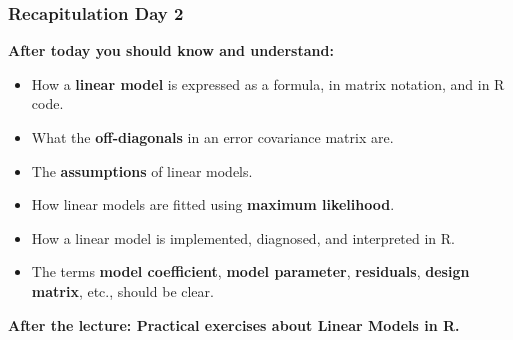 \documentclass{beamer}
\newenvironment{VerbatimIN}
 {\VerbatimEnvironment
  \begin{tcolorbox}[
    breakable,
    colback=lightgray,
    spartan
  ]%
  \begin{Verbatim}}
 {\end{Verbatim}\end{tcolorbox}}
\begin{document}
\begin{frame}[fragile]
\begin{columns}
    \end{columns}
    
\end{frame}

\begin{frame}
    \frametitle{Recapitulation Day 2}
    \textbf{After today you should know and understand:}
    \begin{itemize}
        \item How a \textbf{linear model} is expressed as a formula, in matrix notation, and in R code.
        \item What the \textbf{off-diagonals} in an error covariance matrix are.
        \item The \textbf{assumptions} of linear models.
        \item How linear models are fitted using \textbf{maximum likelihood}.
        \item How a linear model is implemented, diagnosed, and interpreted in R.
        \item The terms \textbf{model coefficient}, \textbf{model parameter}, \textbf{residuals}, \textbf{design matrix}, etc., should be clear.
    \end{itemize}
    \vspace{1cm}
    \textbf{After the lecture: Practical exercises about Linear Models in R.}
\end{frame}
\end{document}
